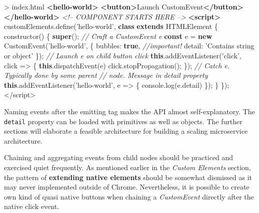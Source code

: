\documentclass[]{article}
\newenvironment{Shaded}{}{}
\newcommand{\KeywordTok}[1]{\textcolor[rgb]{0.00,0.44,0.13}{\textbf{{#1}}}}
\newcommand{\DataTypeTok}[1]{\textcolor[rgb]{0.56,0.13,0.00}{{#1}}}
\newcommand{\StringTok}[1]{\textcolor[rgb]{0.25,0.44,0.63}{{#1}}}
\newcommand{\SpecialStringTok}[1]{\textcolor[rgb]{0.73,0.40,0.53}{{#1}}}
\newcommand{\CommentTok}[1]{\textcolor[rgb]{0.38,0.63,0.69}{\textit{{#1}}}}
\newcommand{\VariableTok}[1]{\textcolor[rgb]{0.10,0.09,0.49}{{#1}}}
\newcommand{\OperatorTok}[1]{\textcolor[rgb]{0.40,0.40,0.40}{{#1}}}
\newcommand{\AttributeTok}[1]{\textcolor[rgb]{0.49,0.56,0.16}{{#1}}}
\newcommand{\NormalTok}[1]{{#1}}
\begin{document}
\begin{Shaded}
\begin{Highlighting}[]
\NormalTok{> index.html}
\KeywordTok{<hello-world>}
 \KeywordTok{<button>}\NormalTok{Launch CustomEvent}\KeywordTok{</button>}
\KeywordTok{</hello-world>}
\CommentTok{<!-- COMPONENT STARTS HERE -->}
\KeywordTok{<script>}
 \VariableTok{customElements}\NormalTok{.}\AttributeTok{define}\NormalTok{(}\StringTok{'hello-world'}\OperatorTok{,} 
 \KeywordTok{class} \KeywordTok{extends} \NormalTok{HTMLElement }\OperatorTok{\{}
  \AttributeTok{constructor}\NormalTok{() }\OperatorTok{\{}
     \KeywordTok{super}\NormalTok{()}\OperatorTok{;}
   \CommentTok{// Craft a CustomEvent e}
     \KeywordTok{const} \NormalTok{e }\OperatorTok{=} \KeywordTok{new} \AttributeTok{CustomEvent}\NormalTok{(}\StringTok{'hello-world'}\OperatorTok{,} \OperatorTok{\{}
    \DataTypeTok{bubbles}\OperatorTok{:} \KeywordTok{true}\OperatorTok{,} \CommentTok{//important!}
    \DataTypeTok{detail}\OperatorTok{:} \StringTok{'Contains string or object'}
   \OperatorTok{\}}\NormalTok{)}\OperatorTok{;}
   \CommentTok{// Launch e on child button click}
   \KeywordTok{this}\NormalTok{.}\AttributeTok{addEventListener}\NormalTok{(}\StringTok{'click'}\OperatorTok{,} \NormalTok{click }\OperatorTok{=>} \OperatorTok{\{}
    \KeywordTok{this}\NormalTok{.}\AttributeTok{dispatchEvent}\NormalTok{(e)}
    \VariableTok{click}\NormalTok{.}\AttributeTok{stopPropagation}\NormalTok{()}\OperatorTok{;}
   \OperatorTok{\}}\NormalTok{)}\OperatorTok{;}
   \CommentTok{// Catch e. Typically done by some parent}
     \CommentTok{// node. Message in detail property}
   \KeywordTok{this}\NormalTok{.}\AttributeTok{addEventListener}\NormalTok{(}\StringTok{'hello-world'}\OperatorTok{,} \NormalTok{e }\OperatorTok{=>} \OperatorTok{\{}
    \VariableTok{console}\NormalTok{.}\AttributeTok{log}\NormalTok{(}\VariableTok{e}\NormalTok{.}\AttributeTok{detail}\NormalTok{)}
   \OperatorTok{\}}\NormalTok{)}\OperatorTok{;}
  \OperatorTok{\}}
 \OperatorTok{\}}\NormalTok{)}\OperatorTok{;}
\OperatorTok{<}\SpecialStringTok{/script>}
\end{Highlighting}
\end{Shaded}

Naming events after the emitting tag makes the API almost
self-explanatory. The \texttt{detail} property can be loaded with
primitives as well as objects. The further sections will elaborate a
feasible architecture for building a scaling microservice architecture.

Chaining and aggregating events from child nodes should be practiced and
exercised quiet frequently. As mentioned earlier in the \emph{Custom
Elements} section, the pattern of \textbf{extending native elements}
should be somewhat dismissed as it may never implemented outside of
Chrome. Nevertheless, it is possible to create own kind of quasi native
buttons when chaining a \emph{CustomEvent} directly after the native
click event.
\end{document}

